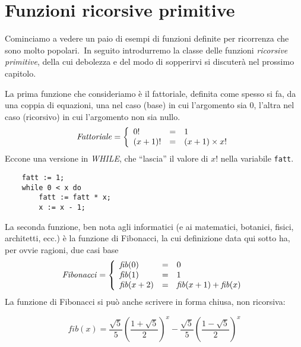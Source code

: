 \section{Funzioni ricorsive primitive}

Cominciamo a vedere un paio di esempi di funzioni definite per ricorrenza che sono molto popolari.\
In seguito introdurremo la classe delle funzioni \textit{ricorsive primitive}, della cui debolezza e del modo di sopperirvi si discuterà nel prossimo capitolo.\

La prima funzione che consideriamo è il fattoriale, definita come spesso si fa, da una coppia di equazioni, una nel caso (base) in cui l'argomento sia 0, l'altra nel caso (ricorsivo) in cui l'argomento non sia nullo.
\[ \mathit{Fattoriale} = \left\{\begin{array}{l c l}
        0!     & = & 1               \\
        (x+1)! & = & (x+1) \times x! \\
    \end{array}\right.\]
Eccone una versione in \textit{\footnotesize WHILE}, che ``lascia'' il valore di $x!$ nella variabile \texttt{fatt}.

\begin{verbatim}
    fatt := 1;
    while 0 < x do
        fatt := fatt * x;
        x := x - 1;
\end{verbatim}

\noindent La seconda funzione, ben nota agli informatici (e ai matematici, botanici, fisici, architetti, ecc.) è la funzione di Fibonacci, la cui definizione data qui sotto ha, per ovvie ragioni, due casi base
\[ \mathit{Fibonacci} = \left\{\begin{array}{l c l}
        \mathit{fib}(0)   & = & 0                                 \\
        \mathit{fib}(1)   & = & 1                                 \\
        \mathit{fib}(x+2) & = & \mathit{fib}(x+1)+\mathit{fib}(x) \\
    \end{array}\right.\]
La funzione di Fibonacci si può anche scrivere in forma chiusa, non ricorsiva:

\[\mathit{fib}(x) = \frac{\sqrt{5}}{5}\left(\frac{1 + \sqrt{5}}{2}\right)^x - \frac{\sqrt{5}}{5}\left(\frac{1 - \sqrt{5}}{2}\right)^x\]

\vspace{12pt}

